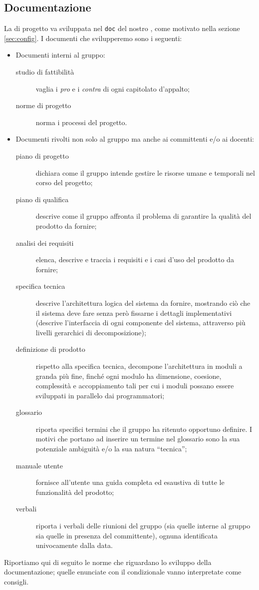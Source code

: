 \subsection{Documentazione} \label{sec:doc}
La  di progetto va sviluppata nel  \texttt{doc} del nostro , come motivato nella sezione \ref{sec:config}. I documenti che svilupperemo sono i seguenti:
\begin{itemize}
	\item Documenti interni al gruppo:
	\begin{description}
		\item[studio di fattibilità] vaglia i \emph{pro} e i \emph{contra} di ogni capitolato d'appalto;
		\item[norme di progetto] norma i processi del progetto.
	\end{description}
	\item Documenti rivolti non solo al gruppo ma anche ai committenti e/o ai docenti:
	\begin{description}
		\item[piano di progetto] dichiara come il gruppo intende gestire le risorse umane e temporali nel corso del progetto;
		\item[piano di qualifica] descrive come il gruppo affronta il problema di garantire la qualità del prodotto da fornire;
		\item[analisi dei requisiti] elenca, descrive e traccia i requisiti e i casi d'uso del prodotto da fornire;
		\item[specifica tecnica] descrive l'architettura logica del sistema da fornire, mostrando ciò che il sistema deve fare senza però fissarne i dettagli implementativi (descrive l'interfaccia di ogni componente del sistema, attraverso più livelli gerarchici di decomposizione);
		\item[definizione di prodotto] rispetto alla specifica tecnica, decompone l'architettura in moduli a granda più fine, finché ogni modulo ha dimensione, coesione, complessità e accoppiamento tali per cui i moduli possano essere sviluppati in parallelo dai programmatori;
		\item[glossario] riporta specifici termini che il gruppo ha ritenuto opportuno definire. I motivi che portano ad inserire un termine nel glossario sono la sua potenziale ambiguità e/o la sua natura “tecnica”;
		\item[manuale utente] fornisce all'utente una guida completa ed esaustiva di tutte le funzionalità del prodotto;
		\item[verbali] riporta i verbali delle riunioni del gruppo (sia quelle interne al gruppo sia quelle in presenza del committente), ognuna identificata univocamente dalla data.
	\end{description}
\end{itemize}
Riportiamo qui di seguito le norme che riguardano lo sviluppo della documentazione; quelle enunciate con il condizionale vanno interpretate come consigli.

